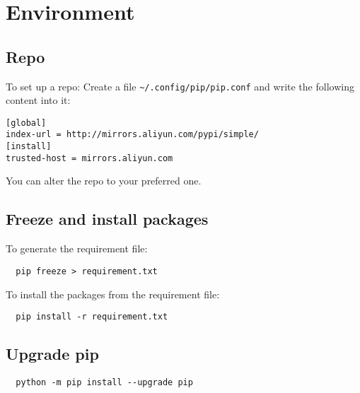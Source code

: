 
\chapter{Environment}

\section{Repo}

To set up a repo:
Create a file \verb|~/.config/pip/pip.conf| and write the following content into it:
\begin{lstlisting}
[global]
index-url = http://mirrors.aliyun.com/pypi/simple/
[install]
trusted-host = mirrors.aliyun.com
\end{lstlisting}

You can alter the repo to your preferred one.


\section{Freeze and install packages}

To generate the requirement file:
\lstset{language=Sh}
\begin{lstlisting}
  pip freeze > requirement.txt
\end{lstlisting}

To install the packages from the requirement file:
\begin{lstlisting}
  pip install -r requirement.txt
\end{lstlisting}


\section{Upgrade pip}

\lstset{language=Sh}
\begin{lstlisting}
  python -m pip install --upgrade pip
\end{lstlisting}


